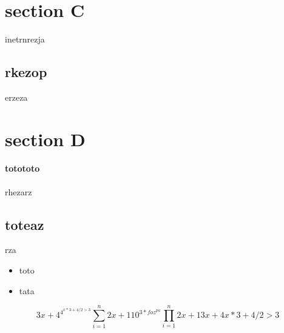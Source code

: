 \documentclass{report}
\begin{document}
\section{section C}{inetrnrezja\subsection{rkezop}{erzeza}}
\section{section D}{\paragraph{totototo}{rhezarz}\subsection{toteaz}{rza}}
\begin{itemize}
	 \item toto

	        \item tata    
\end{itemize}

\begin{equation}
3x+4^{4^{x*3+4/2 > 3}}
{\sum_{i=1 }^{n} 2x+1} 
10^{3*foz^{pa}}
{\prod_{i=1 }^{n} 2x+1}
3x+4x*3+4/2 > 3
\end{equation}
\end{document}
